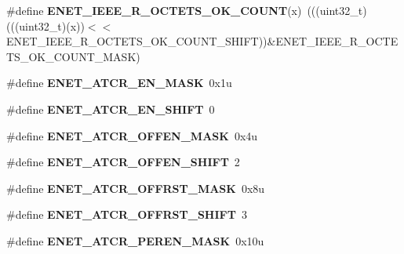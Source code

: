\begin{DoxyCompactItemize}
\item 
\#define {\bfseries E\+N\+E\+T\+\_\+\+I\+E\+E\+E\+\_\+\+R\+\_\+\+O\+C\+T\+E\+T\+S\+\_\+\+O\+K\+\_\+\+C\+O\+U\+NT}(x)~(((uint32\+\_\+t)(((uint32\+\_\+t)(x))$<$$<$E\+N\+E\+T\+\_\+\+I\+E\+E\+E\+\_\+\+R\+\_\+\+O\+C\+T\+E\+T\+S\+\_\+\+O\+K\+\_\+\+C\+O\+U\+N\+T\+\_\+\+S\+H\+I\+FT))\&E\+N\+E\+T\+\_\+\+I\+E\+E\+E\+\_\+\+R\+\_\+\+O\+C\+T\+E\+T\+S\+\_\+\+O\+K\+\_\+\+C\+O\+U\+N\+T\+\_\+\+M\+A\+SK)\hypertarget{group__ENET__Register__Masks_ga45f6f91b88631d8bf05f2fdf05687bde}{}\label{group__ENET__Register__Masks_ga45f6f91b88631d8bf05f2fdf05687bde}

\item 
\#define {\bfseries E\+N\+E\+T\+\_\+\+A\+T\+C\+R\+\_\+\+E\+N\+\_\+\+M\+A\+SK}~0x1u\hypertarget{group__ENET__Register__Masks_gad410926040b6756be05d2278d21dea59}{}\label{group__ENET__Register__Masks_gad410926040b6756be05d2278d21dea59}

\item 
\#define {\bfseries E\+N\+E\+T\+\_\+\+A\+T\+C\+R\+\_\+\+E\+N\+\_\+\+S\+H\+I\+FT}~0\hypertarget{group__ENET__Register__Masks_gaf76be9f51320e23fe6b987d73a2b167b}{}\label{group__ENET__Register__Masks_gaf76be9f51320e23fe6b987d73a2b167b}

\item 
\#define {\bfseries E\+N\+E\+T\+\_\+\+A\+T\+C\+R\+\_\+\+O\+F\+F\+E\+N\+\_\+\+M\+A\+SK}~0x4u\hypertarget{group__ENET__Register__Masks_ga101674b5d969a97f418b6e7e60b4814d}{}\label{group__ENET__Register__Masks_ga101674b5d969a97f418b6e7e60b4814d}

\item 
\#define {\bfseries E\+N\+E\+T\+\_\+\+A\+T\+C\+R\+\_\+\+O\+F\+F\+E\+N\+\_\+\+S\+H\+I\+FT}~2\hypertarget{group__ENET__Register__Masks_gace9d24d80cada8d29ddfc2d9c97595ba}{}\label{group__ENET__Register__Masks_gace9d24d80cada8d29ddfc2d9c97595ba}

\item 
\#define {\bfseries E\+N\+E\+T\+\_\+\+A\+T\+C\+R\+\_\+\+O\+F\+F\+R\+S\+T\+\_\+\+M\+A\+SK}~0x8u\hypertarget{group__ENET__Register__Masks_ga95712a56ae929380d83cd69b67781877}{}\label{group__ENET__Register__Masks_ga95712a56ae929380d83cd69b67781877}

\item 
\#define {\bfseries E\+N\+E\+T\+\_\+\+A\+T\+C\+R\+\_\+\+O\+F\+F\+R\+S\+T\+\_\+\+S\+H\+I\+FT}~3\hypertarget{group__ENET__Register__Masks_gaeee97384c53d1b0f6cd3780fd1d2f1db}{}\label{group__ENET__Register__Masks_gaeee97384c53d1b0f6cd3780fd1d2f1db}

\item 
\#define {\bfseries E\+N\+E\+T\+\_\+\+A\+T\+C\+R\+\_\+\+P\+E\+R\+E\+N\+\_\+\+M\+A\+SK}~0x10u\hypertarget{group__ENET__Register__Masks_ga6c11ce9b10275a6765a5ede784b2bf1f}{}\label{group__ENET__Register__Masks_ga6c11ce9b10275a6765a5ede784b2bf1f}


\end{DoxyCompactItemize}
